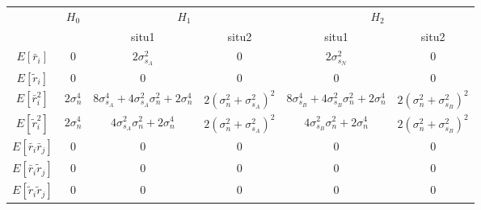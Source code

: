 \begin{table}[h]
  \label{table1}
\begin{tabular}{|c|c|c|c|c|c|}
\hline
\multirow{2}{*}{}           & \multirow{2}{*}{$H_0$} & \multicolumn{2}{c|}{$H_1$}                                                               & \multicolumn{2}{c|}{$H_2$}                                                               \\ \cline{3-6} 
                            &                        & situ1                                                   & situ2                          & situ1                                                   & situ2                          \\ \hline
							$E[\bar{r}_i]$              & $0$                    & $2\sigma_{s_A}^2$                                       & $0$                            & $2\sigma_{s_N}^2$                                                         & $0$                            \\ \hline
$E[\tilde{r}_i]$            & $0$                    & $0$                                                     & $0$                            & $0$                                                     & $0$                            \\ \hline
$E[\bar{r}_i^2]$            & $2\sigma_n^4$          & $8\sigma_{s_A}^4+4\sigma_{s_A}^2\sigma_n^2+2\sigma_n^4$ & $2(\sigma_n^2+\sigma_{s_A}^2)^2$ & $8\sigma_{s_B}^4+4\sigma_{s_B}^2\sigma_n^2+2\sigma_n^4$ & $2(\sigma_n^2+\sigma_{s_B}^2)^2$ \\ \hline
$E[\tilde{r}_i^2]$          & $2\sigma_n^4$          & $4\sigma_{s_A}^2\sigma_n^2+2\sigma_n^4$                 & $2(\sigma_n^2+\sigma_{s_A}^2)^2$ & $4\sigma_{s_B}^2\sigma_n^2+2\sigma_n^4$                 & $2(\sigma_n^2+\sigma_{s_B}^2)^2$ \\ \hline
$E[\bar{r}_i\bar{r}_j]$     & $0$                    & $0$                                                     & $0$                            & $0$                                                     & $0$                            \\ \hline
$E[\bar{r}_i\tilde{r}_j]$   & $0$                    & $0$                                                     & $0$                            & $0$                                                     & $0$                            \\ \hline
$E[\tilde{r}_i\tilde{r}_j]$ & $0$                    & $0$                                                     & $0$                            & $0$                                                     & $0$                            \\ \hline
\end{tabular}
\end{table}


